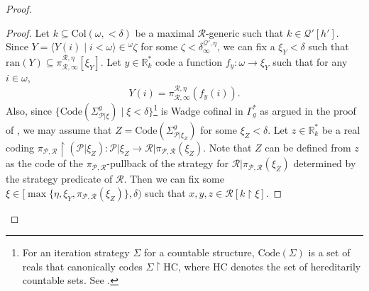 \documentclass{amsart}
\renewcommand{\subset}{\subseteq}
\newcommand{\uphar}{\mathbin{\upharpoonright}}
\begin{document}
\begin{proof}
\begin{proof}
    Let $k\subset\mathrm{Col}(\omega, {<}\delta)$ be a maximal $\mathcal{R}$-generic such that $k\in\mathcal{Q}'[h']$.
    Since $Y=\langle Y(i)\mid i<\omega\rangle\in {}^{\omega}\zeta$ for some $\zeta<\delta^{\mathcal{Q}', \eta}_{\infty}$, we can fix a $\xi_Y<\delta$ such that $\mathrm{ran}(Y)\subset\pi^{\mathcal{R}, \eta}_{\mathcal{R}, \infty}[\xi_Y]$.
    Let $y\in\mathbb{R}^*_{k}$ code a function $f_y\colon\omega\to\xi_Y$ such that for any $i\in\omega$,
    \[
    Y(i)=\pi^{\mathcal{R}, \eta}_{\mathcal{R}, \infty}(f_y(i)).
    \]
    Also, since $\{\mathrm{Code}(\Sigma^g_{\mathcal{P}\vert\xi})\mid\xi<\delta\}$\footnote{For an iteration strategy $\Sigma$ for a countable structure, $\mathrm{Code}(\Sigma)$ is a set of reals that canonically codes $\Sigma\uphar\mathrm{HC}$, where $\mathrm{HC}$ denotes the set of hereditarily countable sets. See \cite[Section 2.7]{CPMP}.} is Wadge cofinal in $\Gamma^*_g$ as argued in the proof of \cite[Proposition 4.2]{CoveringChang}, we may assume that $Z=\mathrm{Code}(\Sigma^g_{\mathcal{P}\vert\xi_Z})$ for some $\xi_Z<\delta$.
    Let $z\in\mathbb{R}^*_k$ be a real coding $\pi_{\mathcal{P}, \mathcal{R}}\uphar(\mathcal{P}\vert\xi_Z)\colon\mathcal{P}\vert\xi_Z\to\mathcal{R}\vert\pi_{\mathcal{P}, \mathcal{R}}(\xi_Z)$.
    Note that $Z$ can be defined from $z$ as the code of the $\pi_{\mathcal{P}, \mathcal{R}}$-pullback of the strategy for $\mathcal{R}\vert\pi_{\mathcal{P}, \mathcal{R}}(\xi_Z)$ determined by the strategy predicate of $\mathcal{R}$.
    Then we can fix some $\xi\in[\max\{\eta, \xi_Y, \pi_{\mathcal{P}, \mathcal{R}}(\xi_Z)\}, \delta)$ such that $x, y, z\in\mathcal{R}[k\uphar\xi]$.


\end{proof}
\end{proof}
\end{document}
